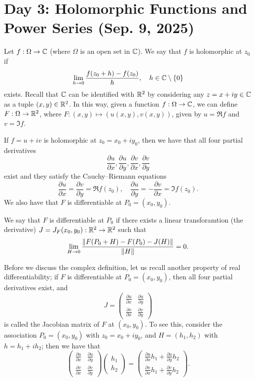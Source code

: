 \section{Day 3: Holomorphic Functions and Power Series (Sep. 9, 2025)}
Let $f : \Omega \to \mathbb C$ (where $\Omega$ is an open set in $\mathbb C$). We say that $f$ is holomorphic at $z_0$ if
\[ \lim_{h \to 0} \frac{f(z_0 + h) - f(z_0)}{h}, \quad h \in \mathbb C \setminus \{0\} \]
exists. Recall that $\mathbb C$ can be identified with $\mathbb R^2$ by considering any $z = x + iy \in \mathbb C$ as a tuple $(x, y) \in \mathbb R^2$. In this way, given a function $f : \Omega \to \mathbb C$, we can define $F : \Omega \to \mathbb R^2$, where $F : (x, y) \mapsto (u(x, y), v(x, y))$, given by $u = \Re f$ and $v = \Im f$.
\begin{proposition}
    If $f = u + iv$ is holomorphic at $z_0 = x_0 + iy_0$, then we have that all four partial derivatives
    \[ \frac{\partial u}{\partial x}, \frac{\partial u}{\partial y}, \frac{\partial v}{\partial x}, \frac{\partial v}{\partial y} \]
    exist and they satisfy the Cauchy--Riemann equations
    \[ \frac{\partial u}{\partial x} = \frac{\partial v}{\partial y} = \Re f(z_0), \quad \frac{\partial u}{\partial y} = -\frac{\partial v}{\partial x} = \Im f(z_0). \]
    We also have that $F$ is differentiable at $P_0 = (x_0, y_0)$.
\end{proposition}
\begin{definition}
    We say that $F$ is differentiable at $P_0$ if there exists a linear transforamtion (the derivative) $J = J_F(x_0, y_0) : \mathbb R^2 \to \mathbb R^2$ such that
    \[ \lim_{H \to 0} \frac{\left\lVert F(P_0 + H) - F(P_0) - J(H) \right\rVert}{\left\lVert H \right\rVert} = 0. \]
\end{definition}
\noindent Before we discuss the complex definition, let us recall another property of real differentiability; if $F$ is differentiable at $P_0 = (x_0, y_0)$, then all four partial derivatives exist, and
\[ J = \begin{pmatrix} \frac{\partial u}{\partial x} & \frac{\partial u}{\partial y} \\ \frac{\partial v}{\partial x} & \frac{\partial v}{\partial y} \end{pmatrix} \]
is called the Jacobian matrix of $F$ at $(x_0, y_0)$. To see this, consider the association $P_0 = (x_0, y_0)$ with $z_0 = x_0 + iy_0$, and $H = (h_1, h_2)$ with $h = h_1 + ih_2$; then we have that
\[ \begin{pmatrix} \frac{\partial u}{\partial x} & \frac{\partial u}{\partial y} \\ \frac{\partial v}{\partial x} & \frac{\partial v}{\partial y} \end{pmatrix} \begin{pmatrix} h_1 \\ h_2 \end{pmatrix} = \begin{pmatrix} \frac{\partial u}{\partial x} h_1 + \frac{\partial u}{\partial y} h_2 \\ \frac{\partial v}{\partial x} h_1 + \frac{\partial v}{\partial y} h_2 \end{pmatrix}. \]
